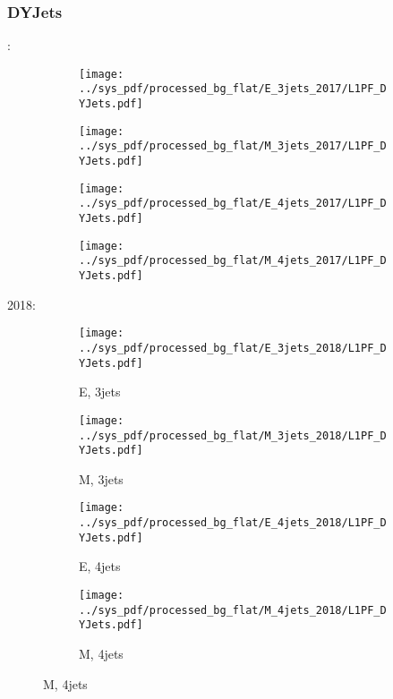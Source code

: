 \documentclass{beamer}
\begin{document}
\begin{frame}
\frametitle{DYJets}
\fontsize{5}{1}:
\begin{figure}
\centering
\begin{subfigure}[b]{0.24\textwidth}
\texttt{[image: ../sys\_pdf/processed\_bg\_flat/E\_3jets\_2017/L1PF\_DYJets.pdf]}
\end{subfigure}
\begin{subfigure}[b]{0.24\textwidth}
\texttt{[image: ../sys\_pdf/processed\_bg\_flat/M\_3jets\_2017/L1PF\_DYJets.pdf]}
\end{subfigure}
\begin{subfigure}[b]{0.24\textwidth}
\texttt{[image: ../sys\_pdf/processed\_bg\_flat/E\_4jets\_2017/L1PF\_DYJets.pdf]}
\end{subfigure}
\begin{subfigure}[b]{0.24\textwidth}
\texttt{[image: ../sys\_pdf/processed\_bg\_flat/M\_4jets\_2017/L1PF\_DYJets.pdf]}
\end{subfigure}
\end{figure}
2018:
\begin{figure}
\centering
\begin{subfigure}[b]{0.24\textwidth}
\texttt{[image: ../sys\_pdf/processed\_bg\_flat/E\_3jets\_2018/L1PF\_DYJets.pdf]}
\captionsetup{font=tiny}
\caption{E, 3jets}
\end{subfigure}
\begin{subfigure}[b]{0.24\textwidth}
\texttt{[image: ../sys\_pdf/processed\_bg\_flat/M\_3jets\_2018/L1PF\_DYJets.pdf]}
\captionsetup{font=tiny}
\caption{M, 3jets}
\end{subfigure}
\begin{subfigure}[b]{0.24\textwidth}
\texttt{[image: ../sys\_pdf/processed\_bg\_flat/E\_4jets\_2018/L1PF\_DYJets.pdf]}
\captionsetup{font=tiny}
\caption{E, 4jets}
\end{subfigure}
\begin{subfigure}[b]{0.24\textwidth}
\texttt{[image: ../sys\_pdf/processed\_bg\_flat/M\_4jets\_2018/L1PF\_DYJets.pdf]}
\captionsetup{font=tiny}
\caption{M, 4jets}
\end{subfigure}
\end{figure}
\end{frame}
\end{document}
